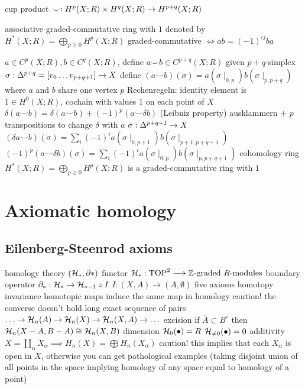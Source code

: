 \begin{outline}
\1 cup product $\smile : H^p(X;R)\times H^q(X;R)\rightarrow H^{p+q}(X;R)$

\1 associative graded-commutative ring with $1$ denoted by $H^*(X;R)=\bigoplus_{p\geq 0} H^p(X;R)$
    \1 graded-commutative $\iff ab = (-1)^{ij}ba$  

\1 $a\in C^p(X;R), b\in C^q(X;R)$, define $a\smile b \in C^{p+q}(X;R)$
    \2 given $p+q$-simplex $\sigma:\Delta^{p+q}=[v_0\ldots v_{p+q+1}] \rightarrow X$
    \2 define $(a\smile b) (\sigma) = a(\sigma\mid_{0,p})b(\sigma\mid_{p,p+q})$ where $a$ and $b$ share one vertex $p$
\1 Rechenregeln:
    \2 identity element is $1\in H^0(X;R)$, cochain with values $1$ on each point of $X$
    \2 $\delta (a\smile b) = \delta (a \smile b) + (-1)^p (a \smile \delta b)$ (Leibniz property)
        \3 ausklammern + $p$ transpositions to change $\delta$ with $a$
        \3 $\sigma:\Delta^{p+q+1}\rightarrow X$
            \4 $(\delta a \smile b)(\sigma)=\sum_i (-1)^i a(\sigma\mid_{0,p+1}) b(\sigma\mid_{p+1,p+q+1})$
            \4 $(-1)^p(a\smile \delta b)(\sigma) = \sum_i (-1)^i a(\sigma\mid_{0,p})b(\sigma\mid_{p,p+q+1})$
\1 cohomology ring $H^*(X;R)=\bigoplus_{p\geq 0} H^p(X;R)$ is a graded-commutative ring with $1$

\end{outline}

\section{Axiomatic homology}

\subsection{Eilenberg-Steenrod axioms}


\begin{outline}
    \1 homology theory $(\mathcal{H}_*, \partial*)$
        \2 functor $\mathcal{H}_*:\operatorname{TOP}^2 \longrightarrow \text{$\mathbb{Z}$-graded $R$-modules}$
        \2 boundary operator $\partial_* : \mathcal{H}_* \rightarrow \mathcal{H}_{*-1}\circ I$
            \3 $I:(X,A)\rightarrow (A,\emptyset)$
    \1 five axioms
        \2 homotopy invariance
            \3 homotopic maps induce the same map in homology 
            \3 caution! the converse doesn't hold
        \2 long exact sequence of pairs\\ 
        $\ldots\rightarrow\mathcal{H}_n(A)\rightarrow \mathcal{H}_n(X)\rightarrow \mathcal{H}_n(X,A)\rightarrow\ldots$
        \2 excision
            \3 if $\overline{A}\subset B^\circ$ then $\mathcal{H}_n(X-A,B-A)\cong \mathcal{H}_n(X,B)$
        \2 dimension
            \3 $\mathcal{H}_0(\bullet)=R$
            \3 $\mathcal{H}_{\neq 0}(\bullet)=0$
        \2 additivity
            \3 $X= \coprod_{\alpha} X_\alpha \implies H_n(X)= \bigoplus H_n(X_\alpha)$
            \3 caution! this implies that each $X_\alpha$ is open in $X$, otherwise you can get pathological examples (taking disjoint union of all points in the space implying homology of any space equal to homology of a point)        
\end{outline}

